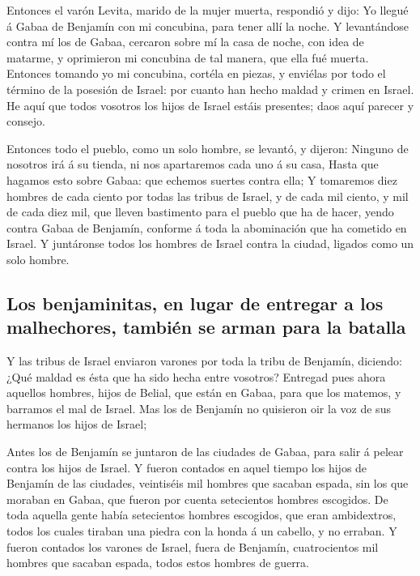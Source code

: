  Entonces el varón Levita, marido de la mujer muerta,
respondió y dijo: Yo llegué á Gabaa de Benjamín con mi concubina, para
tener allí la noche.  Y levantándose contra mí los de
Gabaa, cercaron sobre mí la casa de noche, con idea de matarme, y
oprimieron mi concubina de tal manera, que ella fué muerta.
 Entonces tomando yo mi concubina, cortéla en piezas, y
enviélas por todo el término de la posesión de Israel: por cuanto han
hecho maldad y crimen en Israel.  He aquí que todos
vosotros los hijos de Israel estáis presentes; daos aquí parecer y
consejo.

 Entonces todo el pueblo, como un solo hombre, se levantó,
y dijeron: Ninguno de nosotros irá á su tienda, ni nos apartaremos cada
uno á su casa,  Hasta que hagamos esto sobre Gabaa: que
echemos suertes contra ella;  Y tomaremos diez hombres de
cada ciento por todas las tribus de Israel, y de cada mil ciento, y mil
de cada diez mil, que lleven bastimento para el pueblo que ha de hacer,
yendo contra Gabaa de Benjamín, conforme á toda la abominación que ha
cometido en Israel.  Y juntáronse todos los hombres de
Israel contra la ciudad, ligados como un solo hombre.

\hypertarget{los-benjaminitas-en-lugar-de-entregar-a-los-malhechores-tambiuxe9n-se-arman-para-la-batalla}{%
\subsection{Los benjaminitas, en lugar de entregar a los malhechores,
también se arman para la
batalla}\label{los-benjaminitas-en-lugar-de-entregar-a-los-malhechores-tambiuxe9n-se-arman-para-la-batalla}}

 Y las tribus de Israel enviaron varones por toda la
tribu de Benjamín, diciendo: ¿Qué maldad es ésta que ha sido hecha entre
vosotros?  Entregad pues ahora aquellos hombres, hijos de
Belial, que están en Gabaa, para que los matemos, y barramos el mal de
Israel. Mas los de Benjamín no quisieron oir la voz de sus hermanos los
hijos de Israel;

 Antes los de Benjamín se juntaron de las ciudades de
Gabaa, para salir á pelear contra los hijos de Israel.  Y
fueron contados en aquel tiempo los hijos de Benjamín de las ciudades,
veintiséis mil hombres que sacaban espada, sin los que moraban en Gabaa,
que fueron por cuenta setecientos hombres escogidos.  De
toda aquella gente había setecientos hombres escogidos, que eran
ambidextros, todos los cuales tiraban una piedra con la honda á un
cabello, y no erraban.  Y fueron contados los varones de
Israel, fuera de Benjamín, cuatrocientos mil hombres que sacaban espada,
todos estos hombres de guerra.


